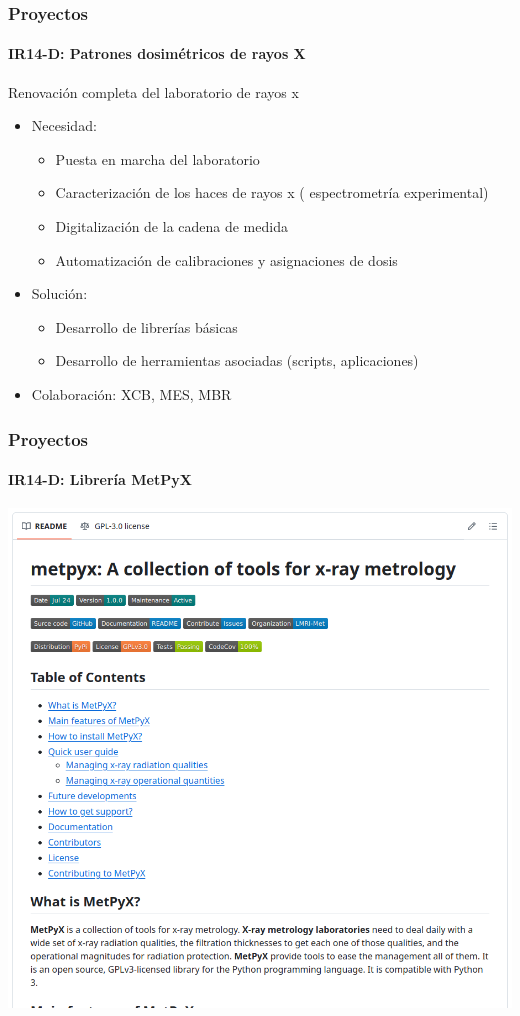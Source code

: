 \documentclass{beamer}
\newcommand{\highlight}[1]{{\color{blue} #1}}
\begin{document}
	\begin{frame}
		\frametitle{Proyectos}
		\framesubtitle{IR14-D: Patrones dosimétricos de rayos X}
		Renovación completa del laboratorio de rayos x
		\begin{itemize}
			\item Necesidad:
			\begin{itemize}
				\item Puesta en marcha del laboratorio
				\item Caracterización de los haces de rayos x (\highlight{espectrometría} experimental)
				\item \highlight{Digitalización} de la cadena de medida
				\item \highlight{Automatización} de calibraciones y asignaciones de dosis
			\end{itemize}
			\item Solución:
			\begin{itemize}
				\item Desarrollo de \highlight{librerías} básicas
				\item Desarrollo de \highlight{herramientas asociadas} (scripts, aplicaciones)
			\end{itemize}
			\item Colaboración: XCB, MES, MBR
		\end{itemize}
	\end{frame}
	
	\begin{frame}
		\frametitle{Proyectos}
		\framesubtitle{IR14-D: Librería MetPyX}
		\centering
		\includegraphics[width=\textwidth]{IR14D_metpyx}
	\end{frame}
	
\end{document}
